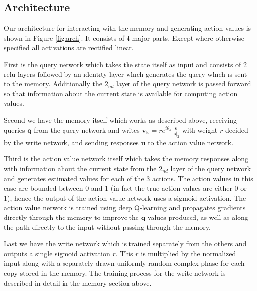 \documentclass{article}
\begin{document}
\subsection*{Architecture}
Our architecture for interacting with the memory and generating action values is shown in Figure \ref{fig:arch}. It consists of 4 major parts. Except where otherwise specified all activations are rectified linear.

First is the query network which takes the state itself as input and consists of 2 relu layers followed by an identity layer which generates the query which is sent to the memory. Additionally the $2_{nd}$ layer of the query network is passed forward so that information about the current state is available for computing action values. 

Second we have the memory itself which works as described above, receiving queries $\pmb{q}$ from the query network and writes $\pmb{v_k}=re^{i\theta_k}\frac{\pmb{s}}{|\pmb{s}|_2}$ with weight $r$ decided by the write network, and sending responses $\pmb{u}$ to the action value network.

Third is the action value network itself which takes the memory responses along with information about the current state from the $2_{nd}$ layer of the query network and generates estimated values for each of the 3 actions. The action values in this case are bounded between 0 and 1 (in fact the true action values are either 0 or 1), hence the output of the action value network uses a sigmoid activation. The action value network is trained using deep Q-learning and propagates gradients directly through the memory to improve the $\pmb{q}$ values produced, as well as along the path directly to the input without passing through the memory.

Last we have the write network which is trained separately from the others and outputs a single sigmoid activation $r$. This $r$ is multiplied by the normalized input along with a separately drawn uniformly random complex phase for each copy stored in the memory. The training process for the write network is described in detail in the memory section above.
\end{document}
